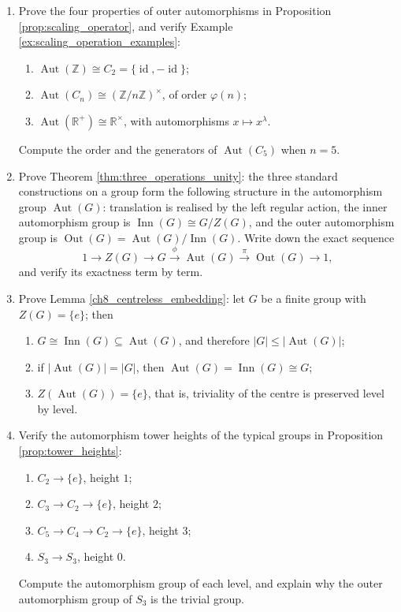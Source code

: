 \begin{enumerate}[leftmargin=3em, label=\textbf{Exercise \arabic*}]
    \item Prove the four properties of outer automorphisms in Proposition \ref{prop:scaling_operator},
    and verify Example \ref{ex:scaling_operation_examples}:
    \begin{enumerate}[label=(\roman*)]
        \item $\operatorname{Aut}(\mathbb{Z})\cong C_2=\{\operatorname{id},-\operatorname{id}\}$;
        \item $\operatorname{Aut}(C_n)\cong(\mathbb{Z}/n\mathbb{Z})^\times$, of order $\varphi(n)$;
        \item $\operatorname{Aut}(\mathbb{R}^+)\cong\mathbb{R}^\times$, with automorphisms $x\mapsto x^\lambda$.
    \end{enumerate}
    Compute the order and the generators of $\operatorname{Aut}(C_5)$ when $n=5$.

    \item Prove Theorem \ref{thm:three_operations_unity}:
    the three standard constructions on a group form the following structure in the automorphism group $\operatorname{Aut}(G)$:
    translation is realised by the left regular action, the inner automorphism group is $\operatorname{Inn}(G)\cong G/Z(G)$,
    and the outer automorphism group is $\operatorname{Out}(G)=\operatorname{Aut}(G)/\operatorname{Inn}(G)$.
    Write down the exact sequence
    \[
    1\to Z(G)\to G\xrightarrow{\phi}\operatorname{Aut}(G)
    \xrightarrow{\pi}\operatorname{Out}(G)\to 1,
    \]
    and verify its exactness term by term.

    \item Prove Lemma \ref{ch8_centreless_embedding}:
    let $G$ be a finite group with $Z(G)=\{e\}$; then
    \begin{enumerate}[label=(\roman*)]
        \item $G\cong\operatorname{Inn}(G)\subseteq\operatorname{Aut}(G)$, and therefore $|G|\le|\operatorname{Aut}(G)|$;
        \item if $|\operatorname{Aut}(G)|=|G|$, then $\operatorname{Aut}(G)=\operatorname{Inn}(G)\cong G$;
        \item $Z(\operatorname{Aut}(G))=\{e\}$, that is, triviality of the centre is preserved level by level.
    \end{enumerate}

    \item Verify the automorphism tower heights of the typical groups in Proposition \ref{prop:tower_heights}:
    \begin{enumerate}[label=(\roman*)]
        \item $C_2\to\{e\}$, height $1$;
        \item $C_3\to C_2\to\{e\}$, height $2$;
        \item $C_5\to C_4\to C_2\to\{e\}$, height $3$;
        \item $S_3\to S_3$, height $0$.
    \end{enumerate}
    Compute the automorphism group of each level, and explain why the outer automorphism group of $S_3$ is the trivial group.


\end{enumerate}
